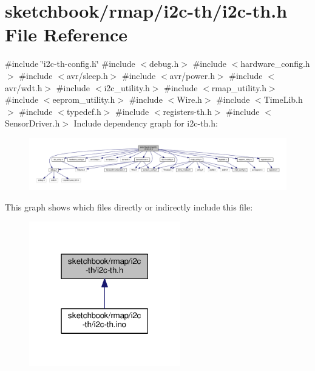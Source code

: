 \hypertarget{i2c-th_8h}{}\section{sketchbook/rmap/i2c-\/th/i2c-\/th.h File Reference}
\label{i2c-th_8h}
{\ttfamily \#include \char`\"{}i2c-\/th-\/config.\+h\char`\"{}}\newline
{\ttfamily \#include $<$debug.\+h$>$}\newline
{\ttfamily \#include $<$hardware\+\_\+config.\+h$>$}\newline
{\ttfamily \#include $<$avr/sleep.\+h$>$}\newline
{\ttfamily \#include $<$avr/power.\+h$>$}\newline
{\ttfamily \#include $<$avr/wdt.\+h$>$}\newline
{\ttfamily \#include $<$i2c\+\_\+utility.\+h$>$}\newline
{\ttfamily \#include $<$rmap\+\_\+utility.\+h$>$}\newline
{\ttfamily \#include $<$eeprom\+\_\+utility.\+h$>$}\newline
{\ttfamily \#include $<$Wire.\+h$>$}\newline
{\ttfamily \#include $<$Time\+Lib.\+h$>$}\newline
{\ttfamily \#include $<$typedef.\+h$>$}\newline
{\ttfamily \#include $<$registers-\/th.\+h$>$}\newline
{\ttfamily \#include $<$Sensor\+Driver.\+h$>$}\newline
Include dependency graph for i2c-\/th.h\+:
\nopagebreak
\begin{figure}[H]
\begin{center}
\leavevmode
\includegraphics[width=350pt]{i2c-th_8h__incl}
\end{center}
\end{figure}
This graph shows which files directly or indirectly include this file\+:
\nopagebreak
\begin{figure}[H]
\begin{center}
\leavevmode
\includegraphics[width=187pt]{i2c-th_8h__dep__incl}
\end{center}
\end{figure}
